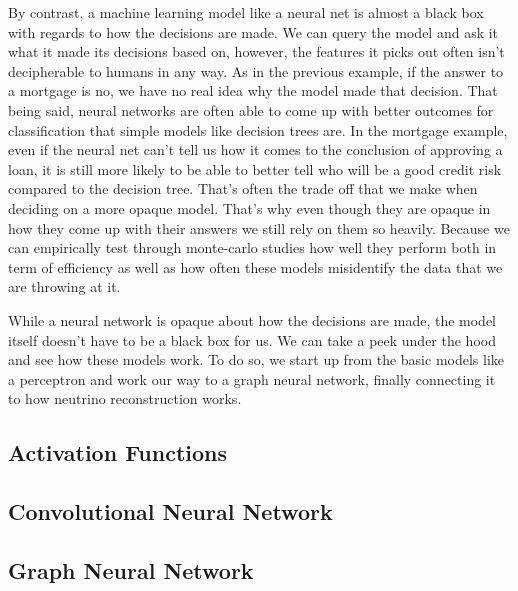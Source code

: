 By contrast, a machine learning model like a neural net is almost a black box with regards to how the decisions are made.
We can query the model and ask it what it made its decisions based on, however, the features it picks out often isn't decipherable to humans in any way.
As in the previous example, if the answer to a mortgage is no, we have no real idea why the model made that decision.
That being said, neural networks are often able to come up with better outcomes for classification that simple models like decision trees are.
In the mortgage example, even if the neural net can't tell us how it comes to the conclusion of approving a loan, it is still more likely to be able to better tell who will be a good credit risk compared to the decision tree.
That's often the trade off that we make when deciding on a more opaque model.
That's why even though they are opaque in how they come up with their answers we still rely on them so heavily.
Because we can empirically test through monte-carlo studies how well they perform both in term of efficiency as well as how often these models misidentify the data that we are throwing at it.

While a neural network is opaque about how the decisions are made, the model itself doesn't have to be a black box for us.
We can take a peek under the hood and see how these models work.
To do so, we start up from the basic models like a perceptron and work our way to a graph neural network, finally connecting it to how neutrino reconstruction works.





\subsection{Activation Functions}





\subsection{Convolutional Neural Network}

\subsection{Graph Neural Network}






 